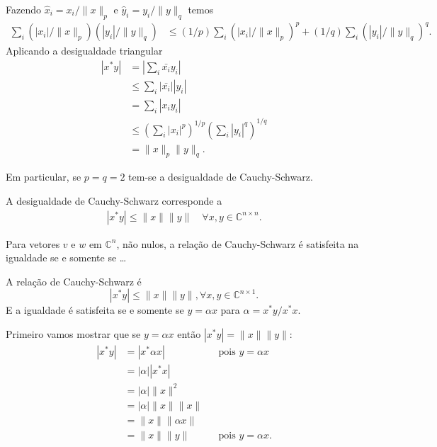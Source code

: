 \documentclass[a4paper,12pt, leqno, answers]{exam}
\begin{document}
\begin{questions}
\begin{solution}
        Fazendo $\hat{x}_i = x_i / \| x \|_p$ e $\hat{y}_i = y_i / \| y \|_q$ temos
        \begin{align*}
            \sum_i \left( | x_i | / \| x \|_p \right) \left( | y_i | / \| y \|_q \right) &\leq \left( 1 / p \right) \sum_i \left( | x_i | / \| x \|_p \right)^p + \left( 1 / q \right) \sum_i \left( | y_i | / \| y \|_q \right)^q.
        \end{align*}
        Aplicando a desigualdade triangular
        \begin{align*}
            | x^* y | &= \left| \sum_i \bar{x_i} y_i \right| \\
            &\leq \sum_i | \bar{x_i} | | y_i | \\
            &= \sum_i | x_i y_i | \\
            &\leq \left( \sum_i | x_i |^p \right)^{1 / p} \left( \sum_i | y_i |^q \right)^{1 / q} \\
            &= \| x \|_p \| y \|_q.
        \end{align*}
    \end{solution}

    Em particular, se $p = q = 2$ tem-se a desigualdade de Cauchy-Schwarz.
    \begin{solution}
        A desigualdade de Cauchy-Schwarz corresponde a
        \begin{align*}
            | x^* y | \leq \| x \| \| y \| \quad \forall x, y \in \mathbb{C}^{n \times n}.
        \end{align*}
    \end{solution}

     Para vetores $v$ e $w$ em $\mathbb{C}^n$, n\~{a}o nulos, a rela\c{c}\~{a}o de Cauchy-Schwarz \'{e} satisfeita na igualdade se e somente se \dots
    \begin{solution}
        A rela\c{c}\~{a}o de Cauchy-Schwarz \'{e}
        \[
        | x^* y | \leq \| x \| \| y \|, \forall x, y \in \mathbb{C}^{n \times 1}.
        \]
        E a igualdade \'{e} satisfeita se e somente se $y = \alpha x$ para $\alpha = x^* y / x^* x$.

        Primeiro vamos mostrar que se $y = \alpha x$ ent\~{a}o $| x^* y | = \| x \| \| y \|$:
        \begin{align*}
            | x^* y | &= | x^* \alpha x | && \text{pois $y = \alpha x$} \\
            &= | \alpha | | x^* x | \\
            &= | \alpha | \| x \|^2 \\
            &= | \alpha | \| x \| \| x \| \\
            &= \| x \| \| \alpha x \| \\
            &= \| x \| \| y \| && \text{pois $y = \alpha x$.}
        \end{align*}


\end{solution}
\end{questions}
\end{document}
